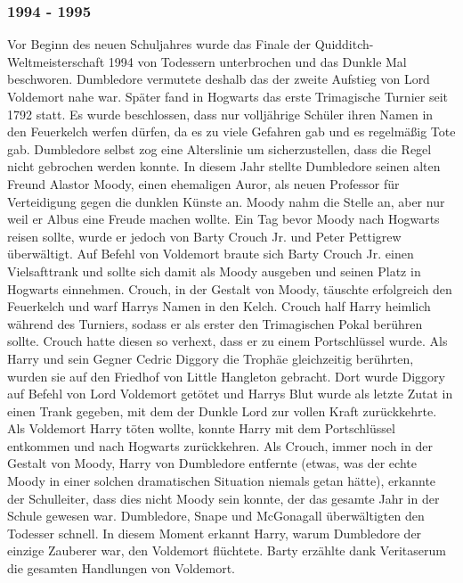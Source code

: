 \documentclass[a4paper, 10pt]{article}
\begin{document}
\subsubsection*{1994 - 1995}
Vor Beginn des neuen Schuljahres wurde das Finale der Quidditch-Weltmeisterschaft 1994 von Todessern unterbrochen und das Dunkle Mal beschworen. Dumbledore vermutete deshalb das der zweite Aufstieg von Lord Voldemort nahe war. Später fand in Hogwarts das erste Trimagische Turnier seit 1792 statt. Es wurde beschlossen, dass nur volljährige Schüler ihren Namen in den Feuerkelch werfen dürfen, da es zu viele Gefahren gab und es regelmäßig Tote gab. Dumbledore selbst zog eine Alterslinie um sicherzustellen, dass die Regel nicht gebrochen werden konnte. In diesem Jahr stellte Dumbledore seinen alten Freund Alastor Moody, einen ehemaligen Auror, als neuen Professor für Verteidigung gegen die dunklen Künste an. Moody nahm die Stelle an, aber nur weil er Albus eine Freude machen wollte.
\vspace{10pt}
\newline
Ein Tag bevor Moody nach Hogwarts reisen sollte, wurde er jedoch von Barty Crouch Jr. und Peter Pettigrew überwältigt. Auf Befehl von Voldemort braute sich Barty Crouch Jr. einen Vielsafttrank und sollte sich damit als Moody ausgeben und seinen Platz in Hogwarts einnehmen. Crouch, in der Gestalt von Moody, täuschte erfolgreich den Feuerkelch und warf Harrys Namen in den
Kelch. Crouch half Harry heimlich während des Turniers, sodass er als erster den Trimagischen Pokal berühren sollte. Crouch hatte diesen so verhext, dass er zu einem Portschlüssel wurde.
\vspace{10pt}
\newline
Als Harry und sein Gegner Cedric Diggory die Trophäe gleichzeitig berührten, wurden sie auf den Friedhof von Little Hangleton gebracht. Dort wurde Diggory auf Befehl von Lord Voldemort getötet und Harrys Blut wurde als letzte Zutat in einen Trank gegeben, mit dem der Dunkle Lord zur vollen Kraft zurückkehrte. Als Voldemort Harry töten wollte, konnte Harry mit dem Portschlüssel entkommen und nach Hogwarts zurückkehren.
\vspace{10pt}
\newline
Als Crouch, immer noch in der Gestalt von Moody, Harry von Dumbledore entfernte (etwas, was der echte Moody in einer solchen dramatischen Situation niemals getan hätte), erkannte der Schulleiter, dass dies nicht Moody sein konnte, der das gesamte Jahr in der Schule gewesen war. Dumbledore, Snape und McGonagall überwältigten den Todesser schnell. In diesem Moment erkannt Harry, warum Dumbledore der einzige Zauberer war, den Voldemort flüchtete. Barty erzählte dank Veritaserum die gesamten Handlungen von Voldemort.
\end{document}
